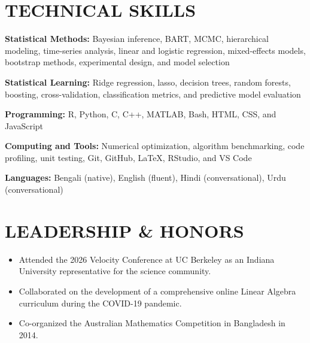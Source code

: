 \documentclass[10pt,letterpaper]{article}
\newenvironment{resumeItems}{%
  \begin{itemize}[
    label=\textbullet,
    leftmargin=14pt,
    labelsep=5pt,
    itemsep=0.5pt,
    topsep=1.0pt,
    parsep=0pt,
    partopsep=0pt
  ]
}{%
  \end{itemize}
}
\begin{document}
\section*{TECHNICAL SKILLS}

\textbf{Statistical Methods:}
Bayesian inference, BART, MCMC, hierarchical modeling, time-series
analysis, linear and logistic regression, mixed-effects models,
bootstrap methods, experimental design, and model selection

\textbf{Statistical Learning:}
Ridge regression, lasso, decision trees, random forests, boosting,
cross-validation, classification metrics, and predictive model
evaluation

\textbf{Programming:}
R, Python, C, C++, MATLAB, Bash, HTML, CSS, and JavaScript

\textbf{Computing and Tools:}
Numerical optimization, algorithm benchmarking,
code profiling, unit testing, Git, GitHub, LaTeX, RStudio, and VS Code

\textbf{Languages:}
Bengali (native), English (fluent), Hindi (conversational),
Urdu (conversational)

\section*{LEADERSHIP \& HONORS}

\begin{resumeItems}
  \item Attended the 2026 Velocity Conference at UC Berkeley as an
  Indiana University representative for the science community.

  \item Collaborated on the development of a comprehensive online
  Linear Algebra curriculum during the COVID-19 pandemic.

  \item Co-organized the Australian Mathematics Competition in
  Bangladesh in 2014.
\end{resumeItems}
\end{document}

